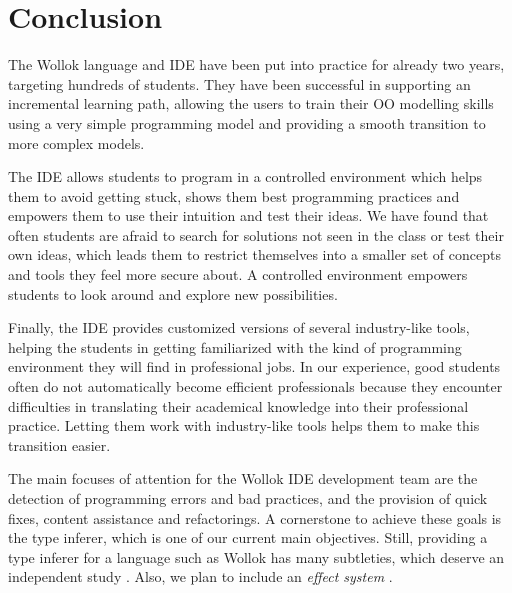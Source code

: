 \section{Conclusion}
\label{sec:conclusion}


The Wollok language and IDE have been put into practice for already two years, targeting hundreds of students.
They have been successful in supporting an incremental learning path, allowing the users to train their OO modelling skills using a very simple programming model and providing a smooth transition to more complex models.


The IDE allows students to program in a controlled environment which helps them to avoid getting stuck, shows them best programming practices and empowers them to use their intuition and test their ideas.
We have found that often students are afraid to search for solutions not seen in the class or test their own ideas, 
which leads them to restrict themselves into a smaller set of concepts and tools they feel more secure about.
A controlled environment empowers students to look around and explore new possibilities.

Finally, the IDE provides customized versions of several industry-like tools, helping the students in getting familiarized with the kind of programming environment they will find in professional jobs.
In our experience, good students often do not automatically become efficient professionals because they encounter difficulties in translating their academical knowledge into their professional practice.
Letting them work with industry-like tools helps them to make this transition easier.

\medskip
The main focuses of attention for the Wollok IDE development team are the detection of programming errors and bad practices, and the provision of quick fixes, content assistance and refactorings.
A cornerstone to achieve these goals is the type inferer, which is one of our current main objectives.
Still, providing a type inferer for a language such as Wollok has many subtleties, which deserve an independent study \cite{passerini_nicolas_extensible_2014}.
Also, we plan to include an \emph{effect system} \cite{nielson_type_1999}.


